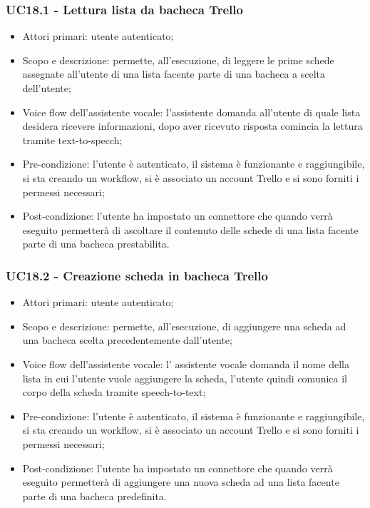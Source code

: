 \subsubsection{UC18.1 - Lettura lista da bacheca Trello}
\begin{itemize}
	\item  Attori primari: utente autenticato;
	\item  Scopo e descrizione: permette, all'esecuzione, di leggere le prime schede assegnate all'utente di una lista facente parte di una bacheca a scelta dell'utente;
	\item  Voice flow dell'assistente vocale: l'assistente domanda all'utente di quale lista desidera ricevere informazioni, dopo aver ricevuto risposta comincia la lettura tramite text-to-specch;
	\item  Pre-condizione: l'utente è autenticato, il sistema è funzionante e raggiungibile, si sta creando un workflow, si è associato un account Trello e si sono forniti i permessi necessari;
	\item  Post-condizione: l'utente ha impostato un connettore che quando verrà eseguito permetterà di ascoltare il contenuto delle schede di una lista facente parte di una bacheca prestabilita.
\end{itemize}
\subsubsection{UC18.2 - Creazione scheda in bacheca Trello}
\begin{itemize}
	\item  Attori primari: utente autenticato;
	\item  Scopo e descrizione: permette, all'esecuzione, di aggiungere una scheda ad una bacheca scelta precedentemente dall'utente;
	\item  Voice flow dell'assistente vocale: l' assistente vocale domanda il nome della lista in cui l'utente vuole aggiungere la scheda, l'utente quindi comunica il corpo della scheda tramite speech-to-text;
	\item  Pre-condizione: l'utente è autenticato, il sistema è funzionante e raggiungibile, si sta creando un workflow, si è associato un account Trello e si sono forniti i permessi necessari;
	\item  Post-condizione: l'utente ha impostato un connettore che quando verrà eseguito permetterà di aggiungere una nuova scheda ad una lista facente parte di una bacheca predefinita.
\end{itemize}
